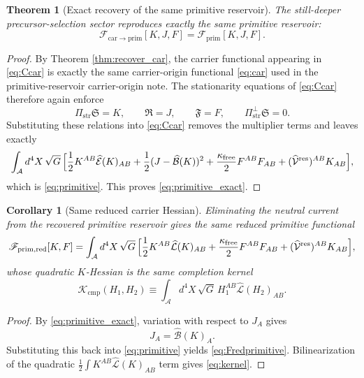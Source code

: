\documentclass[11pt]{article}
\newcommand{\Sub}{\mathcal A}
\newcommand{\ResidualLift}{\widehat{\mathcal V}^{\mathrm{res}}}
\newcommand{\SubEinLin}{\widehat{\mathcal E}}
\newcommand{\SubGaugeVec}{\widehat{\mathcal B}}
\newcommand{\SubReducedEin}{\widehat{\mathcal L}}
\newcommand{\CompKernel}{\mathscr K_{\mathrm{cmp}}}
\newcommand{\PrimFunctional}{\mathscr F_{\mathrm{prim}}}
\newcommand{\CarrierToPrim}{\mathscr F_{\mathrm{car}\to\mathrm{prim}}}
\newcommand{\PrimReduced}{\mathscr F_{\mathrm{prim,red}}}
\newcommand{\FreeStiff}{\kappa_{\mathrm{free}}}
\newcommand{\PrimStrain}{K}
\newcommand{\PrimNeutral}{J}
\newcommand{\PrimFree}{F}
\newcommand{\CarrierProj}{\Pi_{\mathrm{str}}}
\newcommand{\CarrierPerp}{\Pi_{\mathrm{str}}^{\perp}}
\newcommand{\CarrierSeed}{\mathfrak S}
\newcommand{\RelabelSeed}{\mathfrak R}
\newcommand{\FreeSeed}{\mathfrak F}
\newtheorem{corollary}{Corollary}
\newtheorem{theorem}{Theorem}
\begin{document}
\begin{theorem}[Exact recovery of the same primitive reservoir]
\label{thm:recoverprimitive}
The still-deeper precursor-selection sector reproduces exactly the same primitive reservoir:
\begin{equation}
\CarrierToPrim[\PrimStrain,\PrimNeutral,\PrimFree]
=
\PrimFunctional[\PrimStrain,\PrimNeutral,\PrimFree].
\label{eq:primitive_exact}
\end{equation}
\end{theorem}

\begin{proof}
By Theorem \ref{thm:recover_car}, the carrier functional appearing in \eqref{eq:Ccar} is exactly the same carrier-origin functional \eqref{eq:car} used in the primitive-reservoir carrier-origin note. The stationarity equations of \eqref{eq:Ccar} therefore again enforce
\[
\CarrierProj\CarrierSeed=\PrimStrain,
\qquad
\RelabelSeed=\PrimNeutral,
\qquad
\FreeSeed=\PrimFree,
\qquad
\CarrierPerp\CarrierSeed=0.
\]
Substituting these relations into \eqref{eq:Ccar} removes the multiplier terms and leaves exactly
\[
\int_{\Sub} d^4X\,\sqrt{G}\,
\Bigl[
\frac12 \PrimStrain^{AB}\SubEinLin(\PrimStrain)_{AB}
+\frac12(\PrimNeutral-\SubGaugeVec(\PrimStrain))^2
+\frac{\FreeStiff}{2}\PrimFree^{AB}\PrimFree_{AB}
+(\ResidualLift)^{AB}\PrimStrain_{AB}
\Bigr],
\]
which is \eqref{eq:primitive}. This proves \eqref{eq:primitive_exact}.
\end{proof}

\begin{corollary}[Same reduced carrier Hessian]
\label{cor:hessian}
Eliminating the neutral current from the recovered primitive reservoir gives the same reduced primitive functional
\begin{equation}
\PrimReduced[\PrimStrain,\PrimFree]
=
\int_{\Sub} d^4X\,\sqrt{G}\,
\Bigl[
\frac12 \PrimStrain^{AB}\SubReducedEin(\PrimStrain)_{AB}
+\frac{\FreeStiff}{2}\PrimFree^{AB}\PrimFree_{AB}
+(\ResidualLift)^{AB}\PrimStrain_{AB}
\Bigr],
\label{eq:Fredprimitive}
\end{equation}
whose quadratic \(\PrimStrain\)-Hessian is the same completion kernel
\begin{equation}
\CompKernel(H_1,H_2)
\equiv
\int_{\Sub} d^4X\,\sqrt{G}\,
H_1^{AB}\SubReducedEin(H_2)_{AB}.
\label{eq:kernel}
\end{equation}
\end{corollary}

\begin{proof}
By \eqref{eq:primitive_exact}, variation with respect to \(\PrimNeutral_A\) gives
\[
\PrimNeutral_A=\SubGaugeVec(\PrimStrain)_A.
\]
Substituting this back into \eqref{eq:primitive} yields \eqref{eq:Fredprimitive}. Bilinearization of the quadratic \(\frac12\int \PrimStrain^{AB}\SubReducedEin(\PrimStrain)_{AB}\) term gives \eqref{eq:kernel}.
\end{proof}
\end{document}
